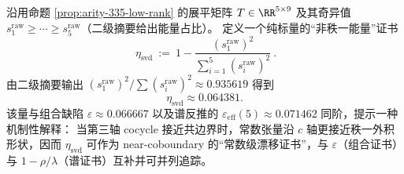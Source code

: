 \begin{remark}\label{rem:arity-335-eta-svd}
沿用命题 \ref{prop:arity-335-low-rank} 的展平矩阵 \(T\in\RR^{5\times 9}\) 及其奇异值 \(s_1^{\mathrm{raw}}\ge\cdots\ge s_5^{\mathrm{raw}}\)（二级摘要给出能量占比）。
定义一个纯标量的“非秩一能量”证书
$$
\boxed{\
\eta_{\mathrm{svd}}
\ :=\
1-\frac{(s_1^{\mathrm{raw}})^2}{\sum_{i=1}^5 (s_i^{\mathrm{raw}})^2}\ }.
$$
由二级摘要输出
\(
(s_1^{\mathrm{raw}})^2/\sum (s_i^{\mathrm{raw}})^2\approx 0.935619
\)
得到
$$
\eta_{\mathrm{svd}}\approx 0.064381.
$$
该量与组合缺陷 \(\varepsilon\approx 0.066667\) 以及谱反推的 \(\varepsilon_{\mathrm{eff}}(5)\approx 0.071462\) 同阶，提示一种机制性解释：
当第三轴 cocycle 接近共边界时，常数张量沿 \(c\) 轴更接近秩一外积形状，因而 \(\eta_{\mathrm{svd}}\) 可作为 near-coboundary 的“常数级漂移证书”，与 \(\varepsilon\)（组合证书）与 \(1-\rho/\lambda\)（谱证书）互补并可并列追踪。
\end{remark}

